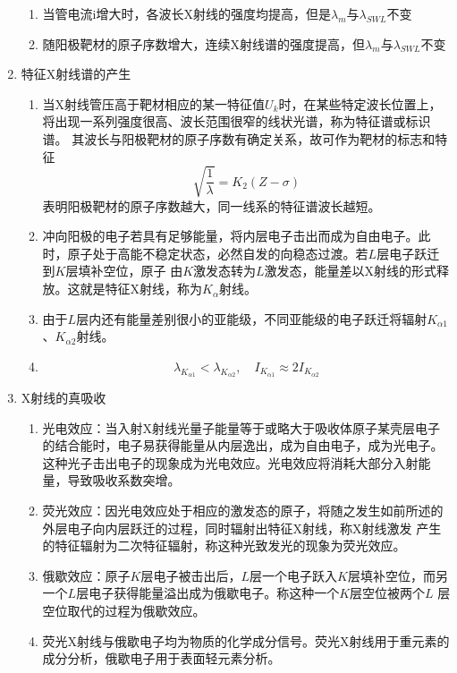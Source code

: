 \documentclass[12pt,a4paper]{article}
\begin{document}
\begin{enumerate}
\begin{enumerate}
                \item 当管电流i增大时，各波长X射线的强度均提高，但是$\lambda_m$与$\lambda_{SWL}$不变
                \item 随阳极靶材的原子序数增大，连续X射线谱的强度提高，但$\lambda_m$与$\lambda_{SWL}$不变
            \end{enumerate}
        \item 特征X射线谱的产生
        \begin{enumerate}
            \item 当X射线管压高于靶材相应的某一特征值$U_k$时，在某些特定波长位置上，将出现一系列强度很高、波长范围很窄的线状光谱，称为特征谱或标识谱。
            其波长与阳极靶材的原子序数有确定关系，故可作为靶材的标志和特征$$\sqrt{\frac{1}{\lambda}}=K_{2}(Z-\sigma)$$表明阳极靶材的原子序数越大，同一线系的特征谱波长越短。
            \item 冲向阳极的电子若具有足够能量，将内层电子击出而成为自由电子。此时，原子处于高能不稳定状态，必然自发的向稳态过渡。若$L$层电子跃迁到$K$层填补空位，原子
            由$K$激发态转为$L$激发态，能量差以X射线的形式释放。这就是特征X射线，称为$K_\alpha$射线。
            \item 由于$L$层内还有能量差别很小的亚能级，不同亚能级的电子跃迁将辐射$K_{\alpha1}$、$K_{\alpha2}$射线。
            \item $$\lambda_{K_{\alpha 1}}<\lambda_{K_{\alpha 2}}, \quad I_{K_{\alpha 1}} \approx 2 I_{K_{\alpha 2}}$$
        \end{enumerate}
        \item X射线的真吸收
        \begin{enumerate}
            \item 光电效应：当入射X射线光量子能量等于或略大于吸收体原子某壳层电子的结合能时，电子易获得能量从内层逸出，成为自由电子，成为光电子。
                这种光子击出电子的现象成为光电效应。光电效应将消耗大部分入射能量，导致吸收系数突增。
            \item 荧光效应：因光电效应处于相应的激发态的原子，将随之发生如前所述的外层电子向内层跃迁的过程，同时辐射出特征X射线，称X射线激发
                产生的特征辐射为二次特征辐射，称这种光致发光的现象为荧光效应。
            \item 俄歇效应：原子$K$层电子被击出后，$L$层一个电子跃入$K$层填补空位，而另一个$L$层电子获得能量溢出成为俄歇电子。称这种一个$K$层空位被两个$L$
                层空位取代的过程为俄歇效应。
            \item 荧光X射线与俄歇电子均为物质的化学成分信号。荧光X射线用于重元素的成分分析，俄歇电子用于表面轻元素分析。

\end{enumerate}
\end{enumerate}
\end{document}
